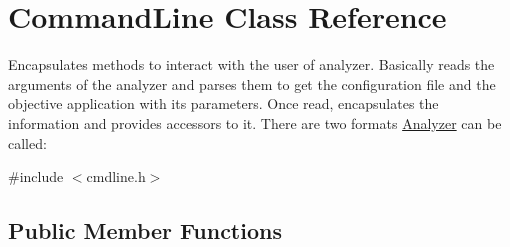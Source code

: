 \hypertarget{class_command_line}{\section{Command\-Line Class Reference}
\label{class_command_line}
}


Encapsulates methods to interact with the user of analyzer. Basically reads the arguments of the analyzer and parses them to get the configuration file and the objective application with its parameters. Once read, encapsulates the information and provides accessors to it. There are two formats \hyperlink{class_analyzer}{Analyzer} can be called\-:  




{\ttfamily \#include $<$cmdline.\-h$>$}

\subsection*{Public Member Functions}

